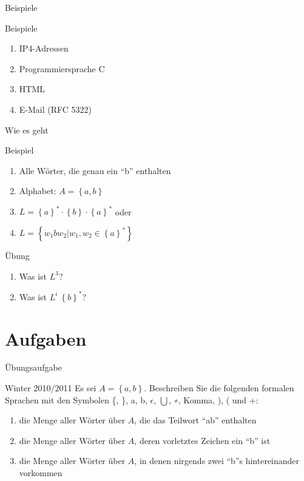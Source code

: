 \begin{frame}{Beispiele}
    \begin{block}{Beispiele}
        \begin{enumerate}
            \item IP4-Adressen
            \item Programmiersprache C
            \item HTML
            \item E-Mail (RFC 5322)
        \end{enumerate}
    \end{block}
\end{frame}

\begin{frame}{Wie es geht}
    \begin{block}{Beispiel}
        \begin{enumerate}
            \item Alle Wörter, die genau ein "`b"' enthalten
                \pause
            \item Alphabet: $A = \left\{ a, b\right\}$
                \pause
            \item $L = \left\{ a\right\}^* \cdot \left\{ b\right\} \cdot \left\{ a\right\}^*$ oder
            \item $L = \left\{ w_1 b w_2 | w_1, w_2 \in \left\{ a\right\}^* \right\}$
        \end{enumerate}
    \end{block}
    \pause
    \begin{block}{Übung}
        \begin{enumerate}
            \item Was ist $L^3$?
                \pause
            \item Was ist $L^i \ \left\{ b\right\}^*$?
        \end{enumerate}
    \end{block}
\end{frame}

\section{Aufgaben}
\begin{frame}{Übungsaufgabe}
    \begin{exampleblock}{Winter 2010/2011}
        Es sei $A = \left\{a, b\right\}$. Beschreiben Sie die folgenden formalen Sprachen mit den Symbolen \{, \}, a, b, $\epsilon$, $\bigcup$, ∗, Komma, ), ( und +:
        \begin{enumerate}
            \item die Menge aller Wörter über $A$, die das Teilwort "`ab"' enthalten
            \item die Menge aller Wörter über $A$, deren vorletztes Zeichen ein "`b"' ist
            \item die Menge aller Wörter über $A$, in denen nirgends zwei "`b"'s hintereinander vorkommen
        \end{enumerate}
    \end{exampleblock}
\end{frame}

